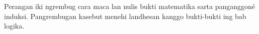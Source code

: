 \documentclass[../../include/open-logic-part]{subfiles}
\begin{document}

\begin{editorial}
Perangan iki ngrembug cara maca lan nulis bukti matematika sarta panganggoné induksi. Pangrembugan kasebut menehi landhesan kanggo bukti-bukti ing bab logika.
\end{editorial}



\OLEndPartHook
\end{document}
